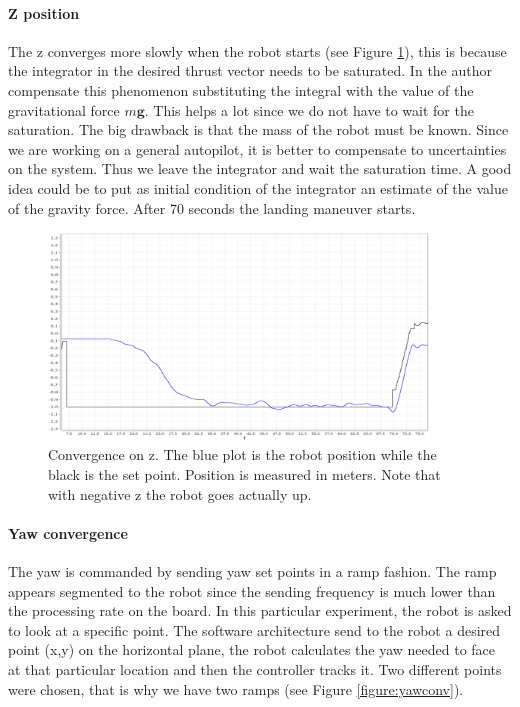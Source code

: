 \paragraph{Z position} The z converges more slowly when the robot starts (see Figure \ref{figure:zconv}), this is because the integrator in the desired thrust vector needs to be saturated. In \cite{Mellinger2012} the author compensate this phenomenon substituting the integral with the value of the gravitational force $m\boldsymbol{g}$. This helps a lot since we do not have to wait for the saturation. The big drawback is that the mass of the robot must be known. Since we are working on a general autopilot, it is better to compensate to uncertainties on the system. Thus we leave the integrator and wait the saturation time. A good idea could be to put as initial condition of the integrator an estimate of the value of the gravity force. After 70 seconds the landing maneuver starts.

\begin{figure}[h]
	\centering
	\noindent
	\includegraphics[width=0.9\textwidth]{z_conv.png}
	\caption[Convergence on z]{Convergence on z. The blue plot is the robot position while the black is the set point. Position is measured in meters. Note that with negative z the robot goes actually up.}
	\label{figure:zconv}
\end{figure}


\paragraph{Yaw convergence} The yaw is commanded by sending yaw set points in a ramp fashion. The ramp appears segmented to the robot since the sending frequency is much lower than the processing rate on the board. In this particular experiment, the robot is asked to look at a specific point. The software architecture send to the robot a desired point (x,y) on the horizontal plane, the robot calculates the yaw needed to face at that particular location and then the controller tracks it. Two different points were chosen, that is why we have two ramps (see Figure \ref{figure:yawconv}).

